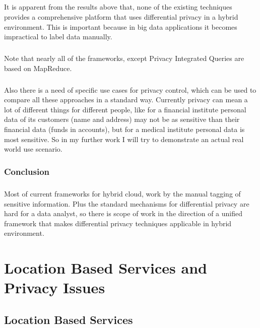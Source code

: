 \documentclass[12pt]{report}
\theoremstyle{named}
\begin{document}
\paragraph{}
It is apparent from the results above that, none of the existing techniques provides a comprehensive platform that uses differential privacy in a hybrid environment. This is important because in big data applications it becomes impractical to label data manually.
\paragraph{}
Note that nearly all of the frameworks, except Privacy Integrated Queries are based on MapReduce.
\paragraph{}
Also there is a need of specific use cases for privacy control, which can be used to compare all these approaches in a standard way. Currently privacy can mean a lot of different things for different people, like for a financial institute personal data of its customers (name and address) may not be as sensitive than their financial data (funds in accounts), but for a medical institute personal data is most sensitive. So in my further work I will try to demonstrate an actual real world use scenario.



\subsection{Conclusion}
\paragraph{}
Most of current frameworks for hybrid cloud, work by the manual tagging of sensitive information. Plus the standard mechanisms for differential privacy are hard for a data analyst, so there is scope of work in the direction of a unified framework that makes differential privacy techniques applicable in hybrid environment. 






\chapter{Location Based Services and Privacy Issues}
\label{chap:LocationBasedServices}
\section{Location Based Services}
\end{document}
